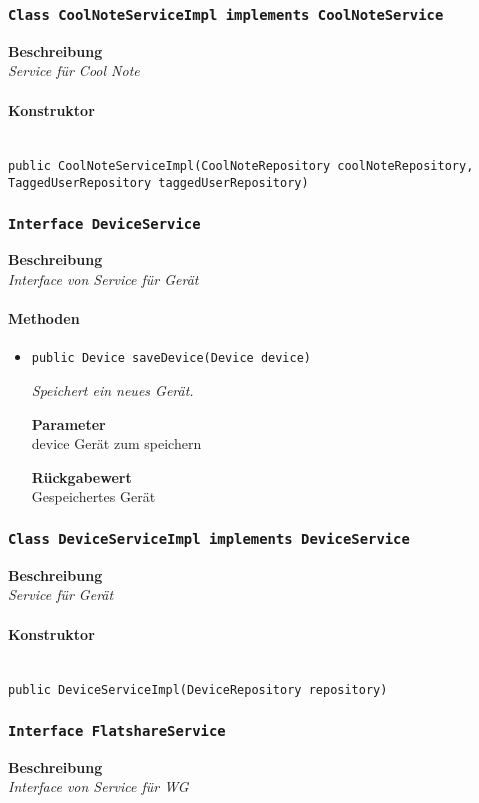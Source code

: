     \subsubsection{\texttt{Class CoolNoteServiceImpl implements CoolNoteService}}
    \textbf{Beschreibung} \\
    \textit{Service für Cool Note}
    \paragraph*{Konstruktor}\mbox{} \\
    \texttt{public CoolNoteServiceImpl(CoolNoteRepository coolNoteRepository, TaggedUserRepository taggedUserRepository)} \\
    \subsubsection{\texttt{Interface DeviceService}}
    \textbf{Beschreibung} \\
    \textit{Interface von Service für Gerät}
    \paragraph*{Methoden}
    \begin{itemize}
    	\item{\texttt{public Device saveDevice(Device device)}}
    	
    	\textit{Speichert ein neues Gerät.}
    	
    	\textbf{Parameter} \\
    	device Gerät zum speichern
    	
    	\textbf{Rückgabewert} \\
    	Gespeichertes Gerät
    \end{itemize}
    \subsubsection{\texttt{Class DeviceServiceImpl implements DeviceService}}
    \textbf{Beschreibung} \\
    \textit{Service für Gerät}
    \paragraph*{Konstruktor}\mbox{} \\
    \texttt{public DeviceServiceImpl(DeviceRepository repository)} \\
    \subsubsection{\texttt{Interface FlatshareService}}
    \textbf{Beschreibung} \\
    \textit{Interface von Service für WG}
